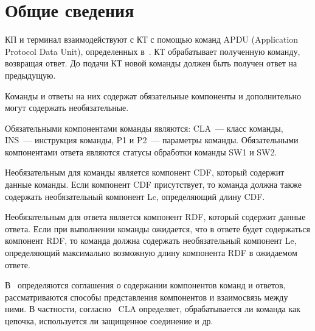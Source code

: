 \section{Общие сведения}\label{CMDS.Intro}

КП и терминал взаимодействуют с КТ с помощью команд APDU 
(Application Protocol Data Unit), определенных в~\cite{APDU}. 
КТ обрабатывает полученную команду, возвращая ответ. До подачи КТ новой команды 
должен быть получен ответ на предыдущую. 

Команды и ответы на них содержат обязательные компоненты и дополнительно 
могут содержать необязательные.  

Обязательными компонентами команды являются: CLA~--- класс команды, INS~---
инструкция команды, P1 и P2~--- параметры команды. Обязательными компонентами
ответа являются статусы обработки команды SW1 и SW2.

Необязательным для команды является компонент CDF, который содержит данные 
команды. Если компонент CDF присутствует, то команда должна также содержать 
необязательный компонент Lc, определяющий длину CDF. 

Необязательным для ответа является компонент RDF, который содержит данные 
ответа. Если при выполнении команды ожидается, что в ответе будет 
содержаться компонент RDF, то команда должна содержать необязательный 
компонент Le, определяющий максимально возможную длину компонента RDF в 
ожидаемом ответе. 

В~\cite{APDU} определяются соглашения о содержании компонентов команд и 
ответов, рассматриваются способы представления компонентов и взаимосвязь между ними. 
В частности, согласно~\cite{APDU} CLA определяет, 
обрабатывается ли команда как цепочка,
используется ли защищенное соединение и др.

